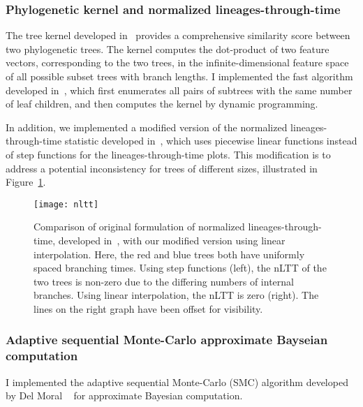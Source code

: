 \subsubsection{Phylogenetic kernel and normalized lineages-through-time}

The tree kernel developed in~\autocite{poon2013mapping} provides a
comprehensive similarity score between two phylogenetic trees. The kernel
computes the dot-product of two feature vectors, corresponding to the two
trees, in the infinite-dimensional feature space of all possible subset trees
with branch lengths. I implemented the fast algorithm developed
in~\autocite{moschitti2006making}, which first enumerates all pairs of subtrees
with the same number of leaf children, and then computes the kernel by dynamic
programming.

In addition, we implemented a modified version of the normalized
lineages-through-time statistic developed in~\autocite{janzen2015approximate},
which uses piecewise linear functions instead of step functions for the
lineages-through-time plots. This modification is to address a potential
inconsistency for trees of different sizes, illustrated in
Figure~\ref{fig:nltt}.

\begin{figure}[ht]
  \centering
  \caption[Comparison of original and modified normalised lineages-through-time]
    {Comparison of original formulation of normalized lineages-through-time,
     developed in~\autocite{janzen2015approximate}, with our modified version
     using linear interpolation. Here, the red and blue trees both have
     uniformly spaced branching times. Using step functions (left), the nLTT
     of the two trees is non-zero due to the differing numbers of internal
     branches. Using linear interpolation, the nLTT is zero (right). The lines
     on the right graph have been offset for visibility.}
  \texttt{[image: nltt]}
  \label{fig:nltt}
\end{figure}

\subsubsection{Adaptive sequential Monte-Carlo approximate Bayseian computation}

I implemented the adaptive sequential Monte-Carlo (SMC) algorithm developed by
Del Moral \etal~\autocite{del2012adaptive} for approximate Bayesian
computation. 


